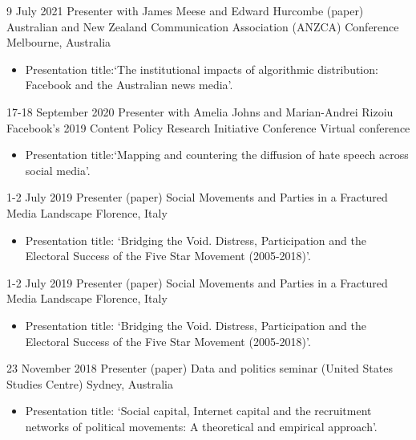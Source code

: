 \documentclass[11pt,a4paper,sans]{moderncv}
\begin{document}
\cventry %
{9 July 2021}
{Presenter with James Meese and Edward Hurcombe (paper)}
{Australian and New Zealand Communication Association (ANZCA) Conference}
{Melbourne, Australia}
{}
       {
      \begin{itemize} %
        \item {Presentation title:`The institutional impacts of algorithmic distribution: Facebook and the Australian news media'.}
      \end{itemize}
    }


\cventry
{17-18 September 2020}
{Presenter with Amelia Johns and Marian-Andrei Rizoiu}
{Facebook's 2019 Content Policy Research Initiative Conference}
{Virtual conference}
{}
       {
      \begin{itemize} %
        \item {Presentation title:`Mapping and countering the diffusion of hate speech across social media'.}
      \end{itemize}
    }


\cventry
    {1-2 July 2019} %
    {Presenter (paper)} %
    {Social Movements and Parties in a Fractured Media Landscape} %
    {Florence, Italy} %
        {}
        {
      \begin{itemize} %
        \item {Presentation title: `Bridging the Void. Distress, Participation and the
Electoral Success of the Five Star Movement (2005-2018)'.}
      \end{itemize}
    }


    \cventry
        {1-2 July 2019} 
    {Presenter (paper)} %
    {Social Movements and Parties in a Fractured Media Landscape} %
    {Florence, Italy} %
        {}
    {
      \begin{itemize} %
        \item {Presentation title: `Bridging the Void. Distress, Participation and the
Electoral Success of the Five Star Movement (2005-2018)'.}
      \end{itemize}
    }
 
    \cventry
       {23 November 2018} %
    {Presenter (paper)} %
    {Data and politics seminar (United States Studies Centre)} %
    {Sydney, Australia} %
 {}
    {
      \begin{itemize} %
        \item {Presentation title: `Social capital, Internet capital and the recruitment networks of political movements: A theoretical and empirical approach'.}
      \end{itemize}
    }
\end{document}
